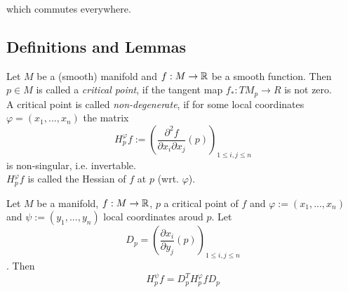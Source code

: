\documentclass[a4paper,11pt]{article}
\begin{document}
which commutes everywhere.

\subsection{Definitions and Lemmas}

\begin{definition}
   \label{def:critical point}

   Let $M$ be a (smooth) manifold and $f: M \rightarrow {\mathbb R}$ be a smooth function.
   Then $p \in M$ is called a \textit{critical point}, if the tangent map 
   $f_*: TM_p \rightarrow R$ is not zero. \\
   A critical point is called \textit{non-degenerate}, if for some local coordinates $\varphi = (x_1, ..., x_n)$
   the matrix 
   \[ H_p^{\varphi}f := \left(\frac{\partial^2 f}{\partial x_i \partial x_j}(p)\right)_{1 \leq i,j \leq n} \]
   is non-singular, i.e. invertable. \\
   $H_p^{\varphi}f$ is called the Hessian of $f$ at $p$ (wrt. $\varphi$).

\end{definition}

\begin{lemma}
   \label{lemma:congruency}   

   Let $M$ be a manifold, $f: M \rightarrow {\mathbb R}$, $p$ a critical point of $f$
   and $\varphi := (x_1, ..., x_n)$ and $\psi := (y_1, ..., y_n)$ local coordinates
   aroud $p$. Let 
   \[ D_p = \left( \frac{\partial x_i}{\partial y_j}(p) \right)_{1 \leq i, j \leq n}\].
   Then 
   \[ H_p^{\psi}f = D_p^T H_p^{\varphi}f D_p \]

\end{lemma}
\end{document}
